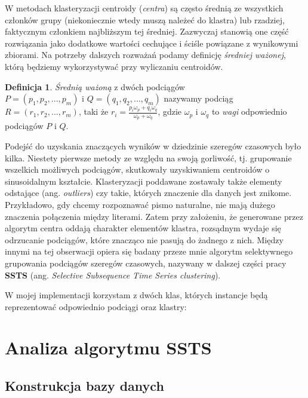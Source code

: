 \documentclass{article}
\theoremstyle{definition}
\newtheorem{defn}{Definicja}
\begin{document}
W metodach klasteryzacji centroidy (\textit{centra}) są często średnią ze wszystkich członków grupy (niekoniecznie wtedy muszą należeć do klastra) lub rzadziej, faktycznym członkiem najbliższym tej średniej. 
Zazwyczaj stanowią one część rozwiązania jako dodatkowe wartości cechujące i ściśle powiązane z wynikowymi zbiorami. Na potrzeby dalszych rozważań podamy definicję \textit{średniej ważonej}, którą będziemy wykorzystywać przy wyliczaniu centroidów.

\begin{defn}
\textit{Średnią ważoną} z dwóch podciągów \\$P = (p_{1}, p_{2}, ..., p_{m})$ i $Q = (q_{1}, q_{2}, ..., q_{m})$ nazywamy podciąg $R = (r_{1}, r_{2}, ..., r_{m})$, taki że $r_{i} = \frac{p_{i}\omega_{p} + q_{i}\omega_{q}}{\omega_{p} + \omega_{q}}$, gdzie $\omega_{p}$ i $\omega_{q}$ to \textit{wagi} odpowiednio podciągów $P$ i $Q$.
\end{defn}

Podejść do uzyskania znaczących wyników w dziedzinie szeregów czasowych było kilka. Niestety pierwsze metody 
ze względu na swoją gorliwość, tj. grupowanie wszelkich możliwych podciągów, skutkowały uzyskiwaniem centroidów o sinusoidalnym 
kształcie. Klasteryzacji poddawane zostawały także elementy odstające (ang. \textit{outliers})
czy takie, których znaczenie dla danych jest znikome. Przykładowo, gdy chcemy rozpoznawać pismo naturalne, nie mają 
dużego znaczenia połączenia między literami. Zatem przy założeniu, że generowane przez algorytm centra oddają charakter 
elementów klastra, rozsądnym wydaje się odrzucanie podciągów, które znacząco nie pasują do żadnego z nich. Między innymi na tej obserwacji opiera się badany przeze mnie algorytm selektywnego grupowania podciągów szeregów czasowych,
nazywany w dalszej części pracy \textbf{SSTS} (ang. \textit{Selective Subsequence Time Series clustering}).

W mojej implementacji korzystam z dwóch klas, których instancje będą reprezentować odpowiednio podciągi oraz klastry:


\section{Analiza algorytmu SSTS}

\subsection{Konstrukcja bazy danych}
\end{document}
